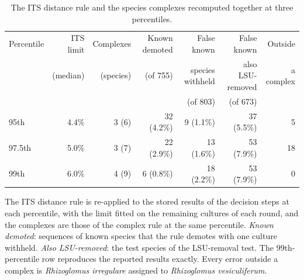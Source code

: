 \begin{table}[htbp]\centering
\begin{threeparttable}
\caption{The ITS distance rule and the species complexes recomputed together at three percentiles.}
\label{tab:percentile}
\footnotesize\setlength{\tabcolsep}{4pt}
\begin{tabular}{lrrrrrr}
\toprule
Percentile & ITS limit & Complexes & Known demoted & False known & False known & Outside\\
 & (median) & (species) & (of 755) & species withheld & also LSU-removed & a complex\\
 & & & & (of 803) & (of 673) & \\
\midrule
95th & 4.4\% & 3 (6) & 32 (4.2\%) & 9 (1.1\%) & 37 (5.5\%) & 5\\
97.5th & 5.0\% & 3 (7) & 22 (2.9\%) & 13 (1.6\%) & 53 (7.9\%) & 18\\
99th & 6.0\% & 4 (9) & 6 (0.8\%) & 18 (2.2\%) & 53 (7.9\%) & 0\\
\bottomrule
\end{tabular}
\begin{tablenotes}\footnotesize
\item The ITS distance rule is re-applied to the stored results of the decision steps at each percentile, with the
limit fitted on the remaining cultures of each round, and the complexes are those of the complex rule at the same
percentile. \emph{Known demoted}: sequences of known species that the rule demotes with one culture withheld.
\emph{Also LSU-removed}: the test species of the LSU-removal test. The 99th-percentile row reproduces
the reported results exactly. Every error outside a complex is \emph{Rhizoglomus irregulare} assigned to
\emph{Rhizoglomus vesiculiferum}.
\end{tablenotes}
\end{threeparttable}
\end{table}
